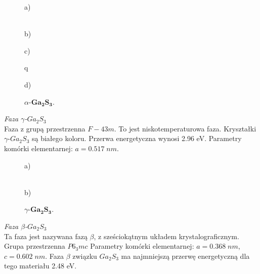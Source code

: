 \begin{figure}[H]
	\begin{minipage}[h]{0.47\linewidth}
		 a) \\
	\end{minipage}
	\hfill
	\begin{minipage}[h]{0.47\linewidth}
		 \\b)
	\end{minipage}
	\vfill
	\begin{minipage}[h]{0.47\linewidth}
		 c) \\
	\end{minipage}q
	\hfill
	\begin{minipage}[h]{0.47\linewidth}
		 d) \\
	\end{minipage}
	\caption{$\alpha$-$\mathbf{Ga_{2}S_{3}}$.}
\end{figure}

\textit{Faza $\gamma$-$Ga_{2}S_{3}$} \\
Faza z grupą przestrzenna $F-43m$. To jest niskotemperaturowa faza. Kryształki $\gamma$-$Ga_{2}S_{3}$ są białego koloru. Przerwa energetyczna wynosi 2.96 eV. Parametry komórki elementarnej: $a=0.517\;nm$.

\begin{figure}[H]
	\begin{minipage}[h]{0.47\linewidth}
		 a) \\
	\end{minipage}
	\hfill
	\begin{minipage}[h]{0.47\linewidth}
		 \\b)
	\end{minipage}
	\caption{$\gamma$-$\mathbf{Ga_{2}S_{3}}$.}
\end{figure}

\textit{Faza $\beta$-$Ga_{2}S_{3}$} \\
Ta faza jest nazywana fazą $\beta$, z sześciokątnym układem krystalograficznym. Grupa przestrzenna $P6_{3}mc$ Parametry komórki elementarnej: $a=0.368\;nm$,  $c=0.602\;nm$. Faza $\beta$ związku $Ga_{2}S_{3}$ ma najmniejszą przerwę energetyczną dla tego materiału 2.48 eV.

